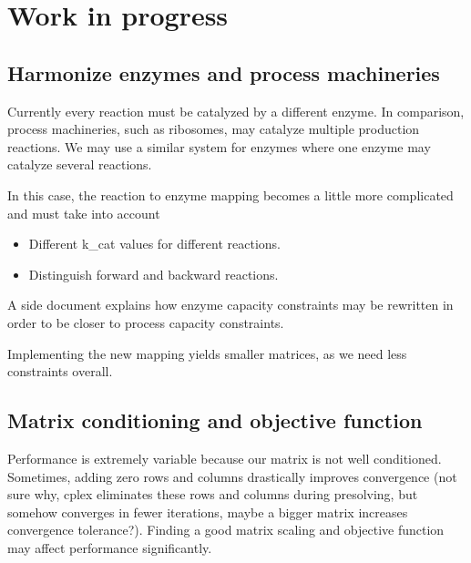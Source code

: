 
\section{Work in progress}

\subsection{Harmonize enzymes and process machineries}

Currently every reaction must be catalyzed by a different enzyme.
In comparison, process machineries, such as ribosomes, may catalyze multiple
production reactions.
We may use a similar system for enzymes where one enzyme may catalyze several
reactions.

In this case, the reaction to enzyme mapping becomes a little more complicated
and must take into account
\begin{itemize}
  \item Different k\_cat values for different reactions.
  \item Distinguish forward and backward reactions.
\end{itemize}
A side document explains how enzyme capacity constraints may be rewritten
in order to be closer to process capacity constraints.

Implementing the new mapping yields smaller matrices, as we need less
constraints overall.

\subsection{Matrix conditioning and objective function}

Performance is extremely variable because our matrix is not well conditioned.
Sometimes, adding zero rows and columns drastically improves convergence
(not sure why, cplex eliminates these rows and columns during presolving, but
somehow converges in fewer iterations, maybe a bigger matrix increases
convergence tolerance?).
Finding a good matrix scaling and objective function may affect performance
significantly.
